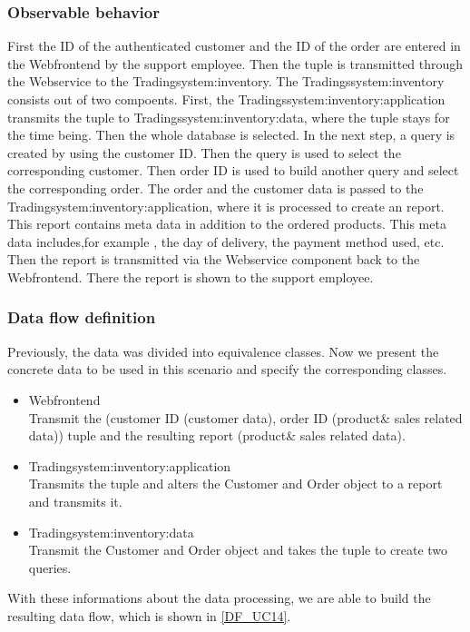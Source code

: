 \subsubsection{Observable behavior}
First the ID of the authenticated customer and the ID of the order are entered in the Webfrontend by the support employee. Then the tuple is transmitted through the Webservice to the Tradingsystem:inventory. The Tradingssystem:inventory consists out of two compoents. First, the Tradingssystem:inventory:application transmits the tuple to Tradingssystem:inventory:data, where the tuple stays for the time being. Then the whole database is selected. In the next step, a query is created by using the customer ID. Then the query is used to select the corresponding customer. Then order ID is used to build another query and select the corresponding order. The order and the customer data is passed to the Tradingsystem:inventory:application, where it is processed to create an report. This report contains meta data in addition to the ordered products. This meta data includes,for example , the day of delivery, the payment method used, etc. Then the report is transmitted via the Webservice component back to the Webfrontend. There the report is shown to the support employee.
\subsubsection{Data flow definition}
Previously, the data was divided into equivalence classes.  Now we present the concrete data to be used in this scenario and specify the corresponding classes.\\
\begin{itemize}
\item Webfrontend\\ Transmit the (customer ID (customer data), order ID (product\& sales related data)) tuple and the resulting report (product\& sales related data).
\item Tradingsystem:inventory:application \\ Transmits the tuple and alters the Customer and Order object to a report and transmits it.
\item Tradingsystem:inventory:data \\ Transmit the Customer and Order object and takes the tuple to create two queries.
\end{itemize}
With these informations about the data processing, we are able to build the resulting data flow, which is shown in \autoref{DF_UC14}.

